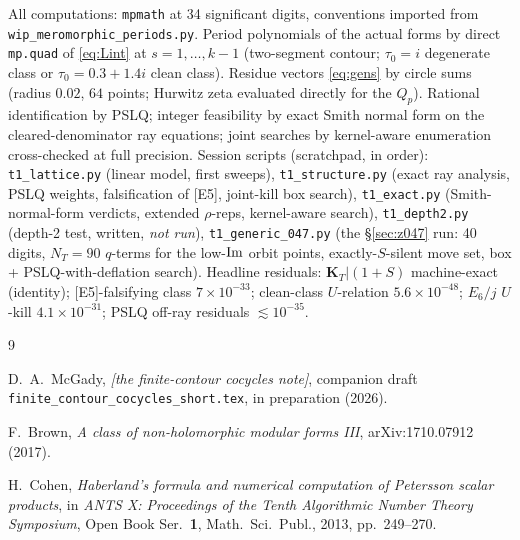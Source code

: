\documentclass[11pt]{article}
\theoremstyle{definition}
\theoremstyle{remark}
\newcommand{\KT}{\mathbf{K}_T}
\begin{document}
All computations: \texttt{mpmath} at 34 significant digits, conventions imported from
\texttt{wip\_meromorphic\_periods.py}.  Period polynomials of the actual forms by direct
\texttt{mp.quad} of \eqref{eq:Lint} at $s=1,\dots,k-1$ (two-segment contour; $\tau_0=i$
degenerate class or $\tau_0=0.3+1.4i$ clean class).  Residue vectors \eqref{eq:gens} by
circle sums (radius $0.02$, $64$ points; Hurwitz zeta evaluated directly for the
$Q_p$).  Rational identification by PSLQ; integer feasibility by exact Smith normal form
on the cleared-denominator ray equations; joint searches by kernel-aware enumeration
cross-checked at full precision.  Session scripts (scratchpad, in order):
\texttt{t1\_lattice.py} (linear model, first sweeps), \texttt{t1\_structure.py} (exact ray
analysis, PSLQ weights, falsification of [E5], joint-kill box search),
\texttt{t1\_exact.py} (Smith-normal-form verdicts, extended $\rho$-reps, kernel-aware
search), \texttt{t1\_depth2.py} (depth-2 test, written, \emph{not run}),
\texttt{t1\_generic\_047.py} (the \S\ref{sec:z047} run: 40 digits, $N_T=90$ $q$-terms for
the low-${\rm Im}$ orbit points, exactly-$S$-silent move set, box + PSLQ-with-deflation
search).  Headline
residuals: $\KT|(1+S)$ machine-exact (identity); [E5]-falsifying class $7\times10^{-33}$;
clean-class $U$-relation $5.6\times10^{-48}$; $E_6/j$ $U$-kill $4.1\times10^{-31}$;
PSLQ off-ray residuals $\lesssim10^{-35}$.

\begin{thebibliography}{9}

D.~A.~McGady,
\emph{[the finite-contour cocycles note]},
companion draft \texttt{finite\_contour\_cocycles\_short.tex}, in preparation (2026).

F.~Brown, \emph{A class of non-holomorphic modular forms III},
arXiv:1710.07912 (2017).

H.~Cohen,
\emph{Haberland's formula and numerical computation of Petersson scalar products},
in \emph{ANTS X: Proceedings of the Tenth Algorithmic Number Theory Symposium},
Open Book Ser.\ \textbf{1}, Math.\ Sci.\ Publ., 2013, pp.\ 249--270.

\end{thebibliography}
\end{document}
